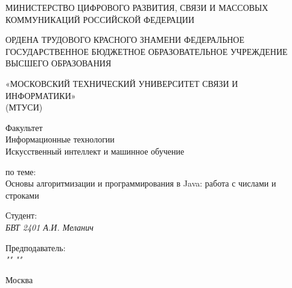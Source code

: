\thispagestyle{empty}

\begin{center}
    МИНИСТЕРСТВО ЦИФРОВОГО РАЗВИТИЯ, СВЯЗИ И МАССОВЫХ КОММУНИКАЦИЙ РОССИЙСКОЙ ФЕДЕРАЦИИ


    ОРДЕНА ТРУДОВОГО КРАСНОГО ЗНАМЕНИ ФЕДЕРАЛЬНОЕ ГОСУДАРСТВЕННОЕ
БЮДЖЕТНОЕ ОБРАЗОВАТЕЛЬНОЕ УЧРЕЖДЕНИЕ ВЫСШЕГО ОБРАЗОВАНИЯ


    «МОСКОВСКИЙ ТЕХНИЧЕСКИЙ УНИВЕРСИТЕТ СВЯЗИ И ИНФОРМАТИКИ» \\ (МТУСИ)
\end{center}

\vfill

\begin{center}
    Факультет \\
    Информационные технологии \\
    Искусственный интеллект и машинное обучение


    \vspace{20pt}

    по теме: \\
    {Основы алгоритмизации и программирования в Java: работа с числами и строками}
\end{center}

\vfill

    \noindent Студент: \\
    \textit{БВТ 2401 \hfill А.И. Меланич}

    \vspace{20pt}

    \noindent Предподаватель: \\
    \textit{"" \hfill ""}

\vfill

\begin{center}
    Москва \the\year
\end{center}
